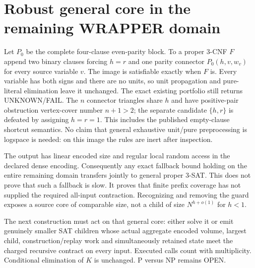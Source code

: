 \section{Robust general core in the remaining WRAPPER domain}
Let $P_0$ be the complete four-clause even-parity block. To a proper
3-CNF $F$ append two binary clauses forcing $h=r$ and one parity
connector $P_0(h,v,w_v)$ for
every source variable $v$. The image is satisfiable exactly when $F$ is.
Every variable has both signs and there are no units, so unit propagation
and pure-literal elimination leave it unchanged. The exact existing
portfolio still returns UNKNOWN/FAIL. The $n$ connector triangles share
$h$ and have positive-pair obstruction vertex-cover number $n+1>2$;
the separate candidate $\{h,r\}$ is defeated by assigning $h=r=1$.
This includes the published empty-clause shortcut semantics. No claim
that general exhaustive unit/pure preprocessing is logspace is needed:
on this image the rules are inert after inspection.

The output has linear encoded size and regular local random access in the
declared dense encoding. Consequently any exact fallback bound holding on
the entire remaining domain transfers jointly to general proper 3-SAT.
This does not prove that such a fallback is slow. It proves that finite
prefix coverage has not supplied the required all-input contraction.
Recognizing and removing the guard exposes a source core of comparable
size, not a child of size $N^{h+o(1)}$ for $h<1$.

The next construction must act on that general core: either solve it or
emit genuinely smaller SAT children whose actual aggregate encoded volume,
largest child, construction/replay work and simultaneously retained state
meet the charged recursive contract on every input. Executed calls count
with multiplicity. Conditional elimination of $K$ is unchanged. P versus
NP remains OPEN.
